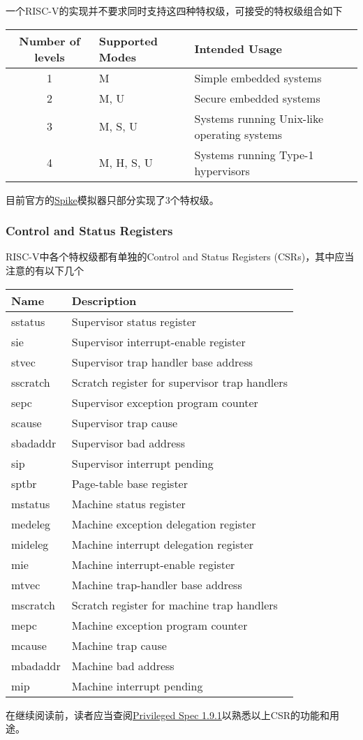 一个RISC-V的实现并不要求同时支持这四种特权级，可接受的特权级组合如下

\begin{longtable}[c]{@{}cll@{}}
\toprule
Number of levels & Supported Modes & Intended Usage\tabularnewline
\midrule
\endhead
1 & M & Simple embedded systems\tabularnewline
2 & M, U & Secure embedded systems\tabularnewline
3 & M, S, U & Systems running Unix-like operating systems\tabularnewline
4 & M, H, S, U & Systems running Type-1 hypervisors\tabularnewline
\bottomrule
\end{longtable}

目前官方的\href{https://github.com/riscv/riscv-isa-sim}{Spike}模拟器只部分实现了3个特权级。

\subsubsection{Control and Status
Registers}\label{control-and-status-registers}

RISC-V中各个特权级都有单独的Control and Status Registers
(CSRs)，其中应当注意的有以下几个

\begin{longtable}[c]{@{}ll@{}}
\toprule
Name & Description\tabularnewline
\midrule
\endhead
sstatus & Supervisor status register\tabularnewline
sie & Supervisor interrupt-enable register\tabularnewline
stvec & Supervisor trap handler base address\tabularnewline
sscratch & Scratch register for supervisor trap handlers\tabularnewline
sepc & Supervisor exception program counter\tabularnewline
scause & Supervisor trap cause\tabularnewline
sbadaddr & Supervisor bad address\tabularnewline
sip & Supervisor interrupt pending\tabularnewline
sptbr & Page-table base register\tabularnewline
mstatus & Machine status register\tabularnewline
medeleg & Machine exception delegation register\tabularnewline
mideleg & Machine interrupt delegation register\tabularnewline
mie & Machine interrupt-enable register\tabularnewline
mtvec & Machine trap-handler base address\tabularnewline
mscratch & Scratch register for machine trap handlers\tabularnewline
mepc & Machine exception program counter\tabularnewline
mcause & Machine trap cause\tabularnewline
mbadaddr & Machine bad address\tabularnewline
mip & Machine interrupt pending\tabularnewline
\bottomrule
\end{longtable}

在继续阅读前，读者应当查阅\href{https://riscv.org/specifications/privileged-isa}{Privileged
Spec 1.9.1}以熟悉以上CSR的功能和用途。

